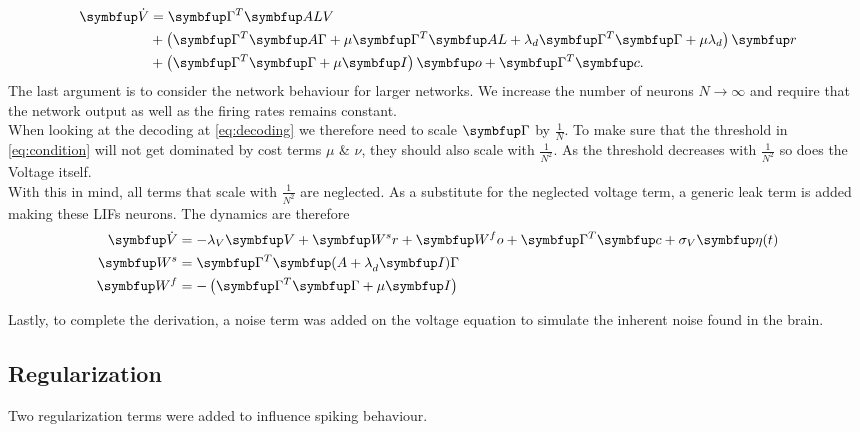 \begin{equation}\label{eq:voltage_limit}
\begin{aligned}
	\bmu{\dot{V}} &= \bmu{\Gamma}^T\bmu{ALV}\\
	 &+ \left(\bmu{\Gamma}^T\bmu{A\Gamma} + \mu\bmu{\Gamma}^T \bmu{AL}+\lambda_d\bmu{\Gamma}^T\bmu{\Gamma} + \mu\lambda_d\right)\bmu{r}\\
	 &+\left(\bmu{\Gamma}^T\bmu{\Gamma} + \mu\bmu{I}\right)\bmu{o} + \bmu{\Gamma}^T\bmu{c}.
\end{aligned}
\end{equation}
The last argument is to consider the network behaviour for larger networks. We increase the number of neurons $N\longrightarrow\infty$ and require that the network output as well as the firing rates remains constant.\\
When looking at the decoding at \cref{eq:decoding} we therefore need to scale $\bmu{\Gamma}$ by $\frac{1}{N}$. To make sure that the threshold in \cref{eq:condition} will not get dominated by cost terms $\mu$ \& $\nu$, they should also scale with $\frac{1}{N^2}$. As the threshold decreases with $\frac{1}{N^2}$ so does the Voltage itself.\\
With this in mind, all terms that scale with $\frac{1}{N^2}$ are neglected. As a substitute for the neglected voltage term, a generic leak term is added making these \acp{LIF} neurons. The dynamics are therefore
\begin{equation}\label{eq:simple_sim}
\begin{aligned}
	\bmu{\dot{V}} &= -\lambda_V \bmu{V} + \bmu{W^sr} + \bmu{W^fo} + \bmu{\Gamma}^T \bmu{c} + \sigma_V\bmu{\eta}(t)\\
	\bmu{W^s} &= \bmu{\Gamma}^T\bmu{(A+\lambda}_d\bmu{I)\Gamma}\\
	\bmu{W^f} & = -\left(\bmu{\Gamma}^T\bmu{\Gamma} + \mu\bmu{I}\right)
\end{aligned}
\end{equation}

Lastly, to complete the derivation, a noise term was added on the voltage equation to simulate the inherent noise found in the brain.

\subsection{Regularization}\label{sssection:regularization}

Two regularization terms were added to influence spiking behaviour.


